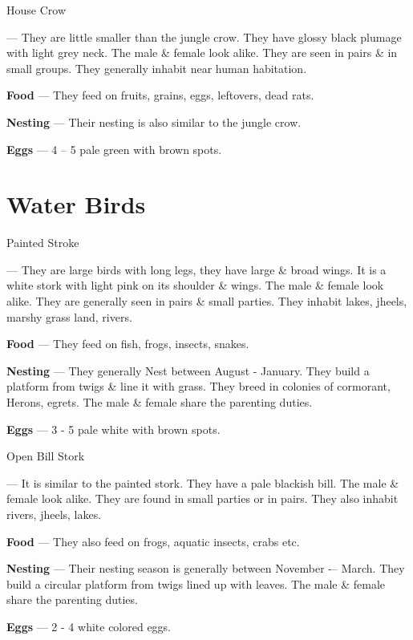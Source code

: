 \begin{bird}{House Crow}

 --- They are little smaller than the jungle crow. They have glossy black plumage with light grey neck. The male \& female look alike. They are seen in pairs \& in small groups. They generally inhabit near human habitation.

{\large\bf Food} --- They feed on fruits, grains, eggs, leftovers, dead rats.

{\large\bf Nesting} --- Their nesting is also similar to the jungle crow.

{\large\bf Eggs} --- 4 -- 5 pale green with brown spots.
\end{bird}

\part{Water Birds}

\begin{bird}{Painted Stroke}

 --- They are large birds with long legs, they have large \& broad wings. It is a white stork with light pink on its shoulder \& wings. The male \& female look alike. They are generally seen in pairs \& small parties. They inhabit lakes, jheels, marshy grass land, rivers.

{\large\bf Food} --- They feed on fish, frogs, insects, snakes.

{\large\bf Nesting} --- They generally Nest between August - January. They build a platform from twigs \& line it with grass. They breed in colonies of cormorant, Herons, egrets. The male \& female share the parenting duties.

{\large\bf Eggs} --- 3 - 5 pale white with brown spots.
\end{bird}

\begin{bird}{Open Bill Stork}

 --- It is similar to the painted stork. They have a pale blackish bill. The male \& female look alike. They are found in small parties or in pairs. They also inhabit rivers, jheels, lakes.

{\large\bf Food} --- They also feed on frogs, aquatic insects, crabs etc.

{\large\bf Nesting} --- Their nesting season is generally between November -– March. They build a circular platform from twigs lined up with leaves. The male \& female share the parenting duties. 

{\large\bf Eggs} --- 2 - 4 white colored eggs.
\end{bird}

